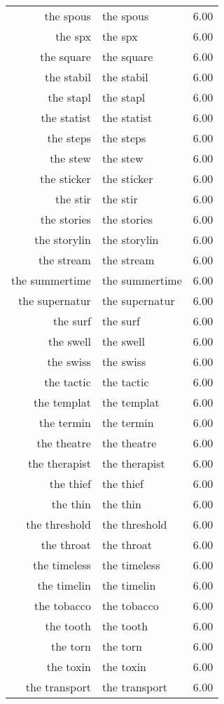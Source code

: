 \begin{table}[ht]
\begin{tabular}{rlr}
  the spous & the spous & 6.00 \\ 
  the spx & the spx & 6.00 \\ 
  the square & the square & 6.00 \\ 
  the stabil & the stabil & 6.00 \\ 
  the stapl & the stapl & 6.00 \\ 
  the statist & the statist & 6.00 \\ 
  the steps & the steps & 6.00 \\ 
  the stew & the stew & 6.00 \\ 
  the sticker & the sticker & 6.00 \\ 
  the stir & the stir & 6.00 \\ 
  the stories & the stories & 6.00 \\ 
  the storylin & the storylin & 6.00 \\ 
  the stream & the stream & 6.00 \\ 
  the summertime & the summertime & 6.00 \\ 
  the supernatur & the supernatur & 6.00 \\ 
  the surf & the surf & 6.00 \\ 
  the swell & the swell & 6.00 \\ 
  the swiss & the swiss & 6.00 \\ 
  the tactic & the tactic & 6.00 \\ 
  the templat & the templat & 6.00 \\ 
  the termin & the termin & 6.00 \\ 
  the theatre & the theatre & 6.00 \\ 
  the therapist & the therapist & 6.00 \\ 
  the thief & the thief & 6.00 \\ 
  the thin & the thin & 6.00 \\ 
  the threshold & the threshold & 6.00 \\ 
  the throat & the throat & 6.00 \\ 
  the timeless & the timeless & 6.00 \\ 
  the timelin & the timelin & 6.00 \\ 
  the tobacco & the tobacco & 6.00 \\ 
  the tooth & the tooth & 6.00 \\ 
  the torn & the torn & 6.00 \\ 
  the toxin & the toxin & 6.00 \\ 
  the transport & the transport & 6.00 \\ 

\end{tabular}
\end{table}
